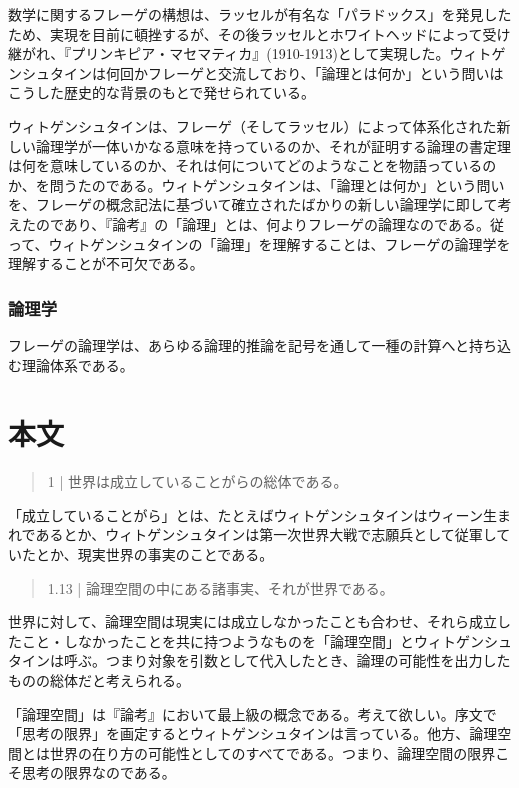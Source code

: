 \documentclass[a4paper,11pt]{jsarticle}
\begin{document}
数学に関するフレーゲの構想は、ラッセルが有名な「パラドックス」を発見したため、実現を目前に頓挫するが、その後ラッセルとホワイトヘッドによって受け継がれ、『プリンキピア・マセマティカ』(1910-1913)として実現した。ウィトゲンシュタインは何回かフレーゲと交流しており、「論理とは何か」という問いはこうした歴史的な背景のもとで発せられている。

ウィトゲンシュタインは、フレーゲ（そしてラッセル）によって体系化された新しい論理学が一体いかなる意味を持っているのか、それが証明する論理の書定理は何を意味しているのか、それは何についてどのようなことを物語っているのか、を問うたのである。ウィトゲンシュタインは、「論理とは何か」という問いを、フレーゲの概念記法に基づいて確立されたばかりの新しい論理学に即して考えたのであり、『論考』の「論理」とは、何よりフレーゲの論理なのである。従って、ウィトゲンシュタインの「論理」を理解することは、フレーゲの論理学を理解することが不可欠である。

\subsubsection{論理学}
フレーゲの論理学は、あらゆる論理的推論を記号を通して一種の計算へと持ち込む理論体系である。

\section{本文}
\begin{quote}
1 | 世界は成立していることがらの総体である。
\end{quote}
「成立していることがら」とは、たとえばウィトゲンシュタインはウィーン生まれであるとか、ウィトゲンシュタインは第一次世界大戦で志願兵として従軍していたとか、現実世界の事実のことである。

\begin{quote}
1.13 | 論理空間の中にある諸事実、それが世界である。
\end{quote}

世界に対して、論理空間は現実には成立しなかったことも合わせ、それら成立したこと・しなかったことを共に持つようなものを「論理空間」とウィトゲンシュタインは呼ぶ。つまり対象を引数として代入したとき、論理の可能性を出力したものの総体だと考えられる。

「論理空間」は『論考』において最上級の概念である。考えて欲しい。序文で「思考の限界」を画定するとウィトゲンシュタインは言っている。他方、論理空間とは世界の在り方の可能性としてのすべてである。つまり、論理空間の限界こそ思考の限界なのである。
\end{document}
